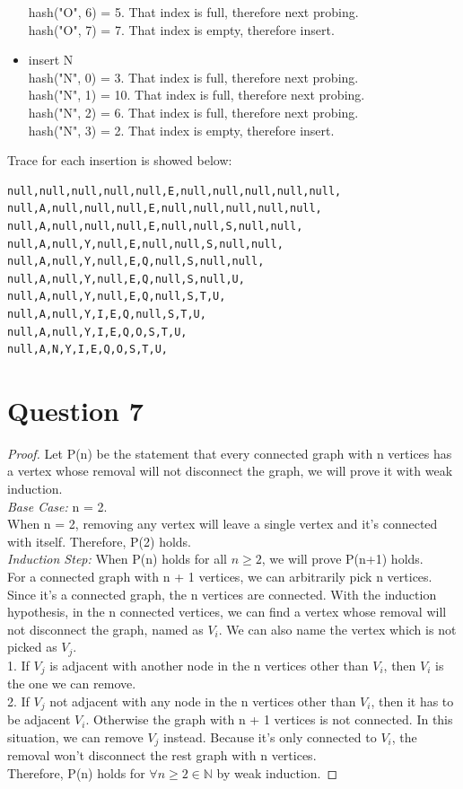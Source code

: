 \documentclass[11pt]{article}
\begin{document}
\begin{itemize}
hash("O", 6) = 5. That index is full, therefore next probing.\\
hash("O", 7) = 7. That index is empty, therefore insert.\\
\item insert N\\
hash("N", 0) = 3. That index is full, therefore next probing.\\
hash("N", 1) = 10. That index is full, therefore next probing.\\
hash("N", 2) = 6. That index is full, therefore next probing.\\
hash("N", 3) = 2. That index is empty, therefore insert.\\
\end{itemize}

Trace for each insertion is showed below: 
\begin{lstlisting}
null,null,null,null,null,E,null,null,null,null,null,
null,A,null,null,null,E,null,null,null,null,null,
null,A,null,null,null,E,null,null,S,null,null,
null,A,null,Y,null,E,null,null,S,null,null,
null,A,null,Y,null,E,Q,null,S,null,null,
null,A,null,Y,null,E,Q,null,S,null,U,
null,A,null,Y,null,E,Q,null,S,T,U,
null,A,null,Y,I,E,Q,null,S,T,U,
null,A,null,Y,I,E,Q,O,S,T,U,
null,A,N,Y,I,E,Q,O,S,T,U,
\end{lstlisting}

\section{Question 7}
\begin{proof}
Let P(n) be the statement that every connected graph with n vertices has a vertex whose removal will not disconnect the graph, we will prove it with weak induction.
\medskip\\
\emph{Base Case:} n = 2.\\
When n = 2, removing any vertex will leave a single vertex and it's connected with itself. Therefore, P(2) holds.
\medskip\\
\emph{Induction Step:} When P(n) holds for all $n \ge 2$, we will prove P(n+1) holds.\\
For a connected graph with n + 1 vertices, we can arbitrarily pick n vertices. Since it's a connected graph, the n vertices are connected. With the induction hypothesis, in the n connected vertices, we can find a vertex whose removal will not disconnect the graph, named as $V_i$. We can also name the vertex which is not picked as $V_j$. \\
1. If $V_j$ is adjacent with another node in the n vertices other than $V_i$, then $V_i$ is the one we can remove. \\
2. If $V_j$ not adjacent with any node in the n vertices other than $V_i$, then it has to be adjacent $V_i$. Otherwise the graph with n + 1 vertices is not connected. In this situation, we can remove $V_j$ instead. Because it's only connected to $V_i$, the removal won't disconnect the rest graph with n vertices.
\\ 
Therefore, P(n) holds for $\forall n \ge 2 \in \mathbb{N}$ by weak induction.
\end{proof}
\end{document}
